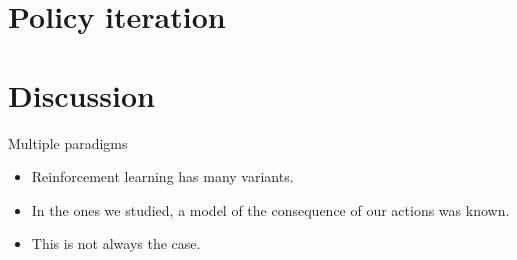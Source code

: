 \documentclass[usenames,dvipsnames,french]{beamer}
\newcounter{numexos}%
\newcommand{\exercice}[1]{%
\addtocounter{numexos}{1}%
\textcolor{DarkOrchid}{Exercice\,\thenumexos\,:}\,#1%
}
\begin{document}
\section{Policy iteration}


%
%
%

\section{Discussion}

\begin{frame}{Multiple paradigms}
   \begin{itemize}
       \item Reinforcement learning has many variants.
        \item In the ones we studied, a model of the consequence of our actions was
            known.
        \item This is not always the case.
   \end{itemize} 
\end{frame}
\end{document}
